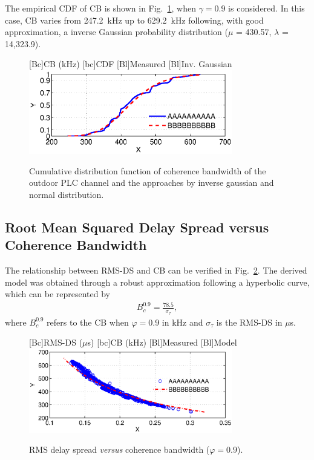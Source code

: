 \documentclass[journal]{IEEEtran}
\newcommand{\tamfig}{3.5in}    %
\begin{document}
The empirical CDF of CB is shown in Fig.~\ref{Fig:BC_CDF}, when  $\gamma = 0.9$ is considered. In this case, CB varies from 247.2~kHz up to 629.2~kHz following, with good approximation, a inverse Gaussian probability distribution ($\mu$ = 430.57, $\lambda$ = 14,323.9).  
\begin{figure}[!htp]
\begin{centering}
    [Bc]{CB (kHz)}    
    [bc]{CDF}
    [Bl]{Measured}
    [Bl]{Inv. Gaussian}
    \includegraphics[width=\tamfig]{Figuras/BC_CDF.eps}
    \caption{Cumulative distribution function of coherence bandwidth of the outdoor PLC channel and the approaches by inverse gaussian and normal distribution.}
    \label{Fig:BC_CDF}
\end{centering}
\end{figure}
  
\subsection{Root Mean Squared Delay Spread versus Coherence Bandwidth}

The relationship between RMS-DS and CB can be verified in Fig.~\ref{Fig:RMSDSxBC}. The derived model was obtained through a robust approximation following a hyperbolic curve, which can be represented by
\begin{eqnarray} \label{eq-RMSDSxBC}
B_c^{0.9} = \frac{78.5}{\sigma_{\tau}},    
\end{eqnarray}
where $B_c^{0.9}$ refers to the CB when $\varphi=0.9$ in kHz and $\sigma_{\tau}$ is the RMS-DS in $\mu$s.

\begin{figure}[!htp]
\begin{centering}
    [Bc]{RMS-DS ($\mu$s)}    
    [bc]{CB (kHz)}
    [Bl]{Measured}
    [Bl]{Model}
    \includegraphics[width=\tamfig]{Figuras/RMSDSxBC.eps}
    \caption{RMS delay spread \emph{versus} coherence bandwidth ($\varphi = 0.9$).}
    \label{Fig:RMSDSxBC}
\end{centering}
\end{figure}
\end{document}
